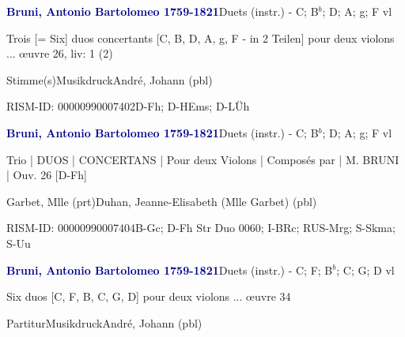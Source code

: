 \documentclass[twocolumn, 12pt]{book}
\begin{document}
\par \vspace{16pt} \textcolor{darkblue}{\textbf{Bruni, Antonio Bartolomeo  1759-1821}}\hfillplus{\textbf{[249]}}\newline Duets (instr.) - C; B$^b$; D; A; g; F vl
\par \begin{itshape}Trois [= Six] duos concertants [C, B, D, A, g, F - in 2 Teilen] pour deux violons ... œuvre 26, liv: 1 (2)\end{itshape} 
\par \textcolor{darkblue}{}  Stimme(s)\newline Musikdruck\newline André, Johann  (pbl)
\par RISM-ID: 00000990007402\newline D-Fh; D-HEms; D-LÜh
\par \vspace{16pt} \textcolor{darkblue}{\textbf{Bruni, Antonio Bartolomeo  1759-1821}}\hfillplus{\textbf{[250]}}\newline Duets (instr.) - C; B$^b$; D; A; g; F vl
\par \begin{itshape}Trio | DUOS | CONCERTANS | Pour deux Violons | Composés par | M. BRUNI | Ouv. 26 [D-Fh]\end{itshape} \newline Garbet, Mlle  (prt)\newline Duhan, Jeanne-Elisabeth (Mlle Garbet)  (pbl)
\par RISM-ID: 00000990007404\newline B-Gc; D-Fh  Str Duo 0060; I-BRc; RUS-Mrg; S-Skma; S-Uu
\par \vspace{16pt} \textcolor{darkblue}{\textbf{Bruni, Antonio Bartolomeo  1759-1821}}\hfillplus{\textbf{[251]}}\newline Duets (instr.) - C; F; B$^b$; C; G; D vl
\par \begin{itshape}Six duos [C, F, B, C, G, D] pour deux violons ... œuvre 34\end{itshape} 
\par \textcolor{darkblue}{}  Partitur\newline Musikdruck\newline André, Johann  (pbl)
\end{document}
